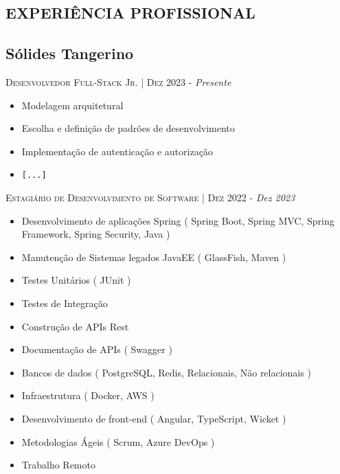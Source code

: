 
\begin{framed}
  \section{EXPERIÊNCIA PROFISSIONAL}

  \subsection{  Sólides Tangerino}

  \textsc{Desenvolvedor Full-Stack Jr.} | \textsc{Dez 2023} - \emph{Presente}
  \small{
    \begin{itemize}[leftmargin=*]
      \item Modelagem arquitetural
      \item Escolha e definição de padrões de desenvolvimento
      \item Implementação de autenticação e autorização
      \item \verb|[...]|
    \end{itemize}
  }

  \textsc{Estagiário de Desenvolvimento de Software} | \textsc{Dez 2022} - \emph{Dez 2023}
  \small{
    \begin{itemize}[leftmargin=*]
      \item Desenvolvimento de aplicações Spring ( Spring Boot, Spring MVC, Spring Framework, Spring Security, Java )
      \item Manutenção de Sistemas legados JavaEE ( GlassFish, Maven )
      \item Testes Unitários ( JUnit )
      \item Testes de Integração
      \item Construção de APIs Rest
      \item Documentação de APIs ( Swagger )
      \item Bancos de dados ( PostgreSQL, Redis, Relacionais, Não relacionais )
      \item Infraestrutura ( Docker, AWS )
      \item Desenvolvimento de front-end ( Angular, TypeScript, Wicket )
      \item Metodologias Ágeis ( Scrum, Azure DevOps )
      \item Trabalho Remoto
    \end{itemize}
  }


\end{framed}